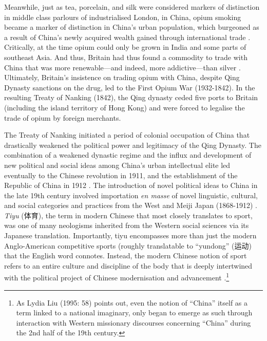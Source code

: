   Meanwhile, just as tea, porcelain, and silk were considered markers of distinction in middle class parlours of industrialised London, in China, opium smoking became a marker of distinction in China's urban population, which burgeoned as a result of China's newly acquired wealth gained through international trade \citep{Zheng2005}.  Critically, at the time opium could only be grown in India and some parts of southeast Asia. And thus, Britain had thus found a commodity to trade with China that was more renewable---and indeed, more addictive---than silver \citep{Fay2005}.  Ultimately, Britain's insistence on trading opium with China, despite Qing Dynasty sanctions on the drug, led to the First Opium War (1932-1842). In the resulting Treaty of Nanking (1842), the Qing dynasty ceded five ports to Britain (including the island territory of Hong Kong) and were forced to legalise the trade of opium by foreign merchants.

  The Treaty of Nanking initiated a period of colonial occupation of China that drastically weakened the political power and legitimacy of the Qing Dynasty. The combination of a weakened dynastic regime and the influx and development of new political and social ideas among China's urban intellectual elite led eventually to the Chinese revolution in 1911, and the establishment of the Republic of China in 1912 \citep{Mitter2008}.  The introduction of novel political ideas to China in the late 19th century involved importation \textit{en masse} of novel linguistic, cultural, and social categories and practices from the West and Meiji Japan (1868-1912) \citep{Liu1995}. \textit{Tiyu} (体育), the term in modern Chinese that most closely translates to sport, was one of many neologisms inherited from the Western social sciences via its Japanese translation.  Importantly,  tiyu encompasses more than just the modern Anglo-American competitive sports (roughly translatable to ``yundong'' (运动) that the English word connotes.  Instead, the modern Chinese notion of sport refers to an entire culture and discipline of the body that is deeply intertwined with the political project of Chinese modernisation and advancement \citep{Morris2004}.\footnote{As Lydia Liu (1995: 58) points out, even the notion of “China” itself as a term linked to a national imaginary, only began to emerge as such through interaction with Western missionary discourses concerning ``China'' during the 2nd half of the 19th century.}

